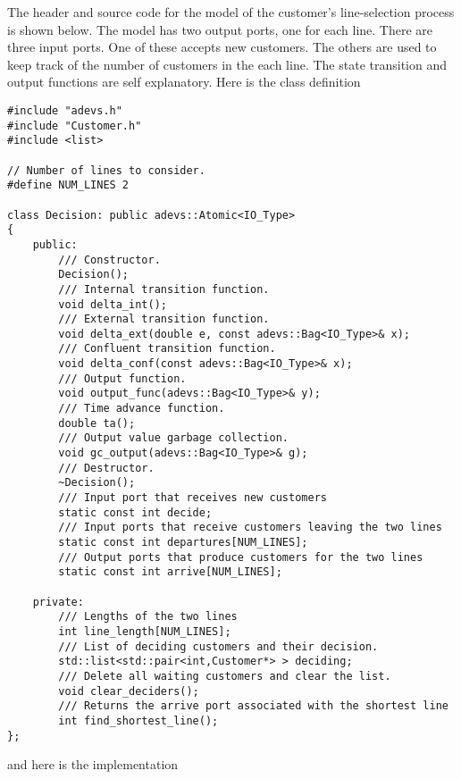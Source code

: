 The header and source code for the model of the customer's line-selection process is shown below. The model has two output
ports, one for each line. There are three input ports. One of these
accepts new customers. The others are used to keep track of the
number of customers in the each line. The state transition and output
functions are self explanatory. Here is the class definition
\begin{verbatim}
#include "adevs.h"
#include "Customer.h"
#include <list>

// Number of lines to consider.
#define NUM_LINES 2

class Decision: public adevs::Atomic<IO_Type>
{
    public:
        /// Constructor.
        Decision();
        /// Internal transition function.
        void delta_int();
        /// External transition function.
        void delta_ext(double e, const adevs::Bag<IO_Type>& x);
        /// Confluent transition function.
        void delta_conf(const adevs::Bag<IO_Type>& x);
        /// Output function.  
        void output_func(adevs::Bag<IO_Type>& y);
        /// Time advance function.
        double ta();
        /// Output value garbage collection.
        void gc_output(adevs::Bag<IO_Type>& g);
        /// Destructor.
        ~Decision();
        /// Input port that receives new customers
        static const int decide;
        /// Input ports that receive customers leaving the two lines
        static const int departures[NUM_LINES];
        /// Output ports that produce customers for the two lines
        static const int arrive[NUM_LINES];

    private:
        /// Lengths of the two lines
        int line_length[NUM_LINES];
        /// List of deciding customers and their decision.
        std::list<std::pair<int,Customer*> > deciding;
        /// Delete all waiting customers and clear the list.
        void clear_deciders();
        /// Returns the arrive port associated with the shortest line
        int find_shortest_line();
};
\end{verbatim}
and here is the implementation
